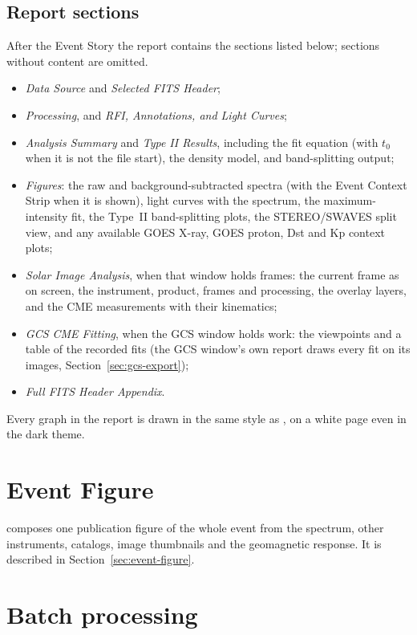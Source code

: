 \subsection{Report sections}

After the Event Story the report contains the sections listed below; sections without content
are omitted.
\begin{itemize}
  \item \emph{Data Source} and \emph{Selected FITS Header};
  \item \emph{Processing}, and \emph{RFI, Annotations, and Light Curves};
  \item \emph{Analysis Summary} and \emph{Type II Results}, including the fit equation (with
    \(t_0\) when it is not the file start), the density model, and band-splitting output;
  \item \emph{Figures}: the raw and background-subtracted spectra (with the Event Context Strip
    when it is shown), light curves with the spectrum, the maximum-intensity fit, the Type~II
    band-splitting plots, the STEREO/SWAVES split view, and any
    available GOES X-ray, GOES proton, Dst and Kp context plots;
  \item \emph{Solar Image Analysis}, when that window holds frames: the current frame as on
    screen, the instrument, product, frames and processing, the overlay layers, and the CME
    measurements with their kinematics;
  \item \emph{GCS CME Fitting}, when the GCS window holds work: the viewpoints and a table of
    the recorded fits (the GCS window's own report draws every fit on its images,
    Section~\ref{sec:gcs-export});
  \item \emph{Full FITS Header Appendix}.
\end{itemize}
Every graph in the report is drawn in the same style as , on a white page
even in the dark theme.

\section{Event Figure}

 composes one publication figure of the whole event
from the spectrum, other instruments, catalogs, image thumbnails and the geomagnetic response.
It is described in Section~\ref{sec:event-figure}.

\section{Batch processing}
\label{sec:batch}

